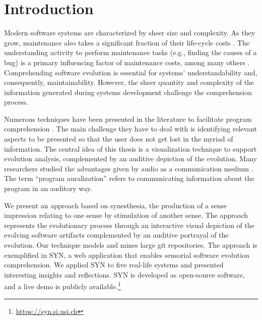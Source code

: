 \documentclass[11pt,twoside,english,singlespacing,headsepline,consistentlayout]{auxiliary/si-msc-thesis}
\author{Gianlorenzo Occhipinti}
\newcommand{\quotes}[1]{``#1''}
\begin{document}
\frontmatter
\pagestyle{plain}




\mainmatter
 
\pagestyle{thesis} 



\section*{Introduction}
Modern software systems are characterized by sheer size and complexity. As they grow, maintenance also takes a significant fraction of their life-cycle costs \cite{Davis1995, Sommerville1995, Erlikh2000, seacord2003}. The understanding activity to perform maintenance tasks (e.g., finding the causes of a bug) is a primary influencing factor of maintenance costs, among many others \cite{Corbi1989}.
Comprehending software evolution is essential for systems' understandability and, consequently, maintainability. However, the sheer quantity and complexity of the information generated during systems development challenge the comprehension process.

Numerous techniques have been presented in the literature to facilitate program comprehension \cite{Lanza2001, DAmbros2006, Steinbrueckner2010, Wettel2011, Alexandru2019, SoftwareEvolution}. The main challenge they have to deal with is identifying relevant aspects to be presented so that the user does not get lost in the myriad of information. 
The central idea of this thesis is a visualization technique to support evolution analysis, complemented by an auditive depiction of the evolution. 
Many researchers studied the advantages given by audio as a communication medium \cite{Alty1995, Vickers2004, Boccuzzo2009, McIntosh2014, Mancino2017}.
The term \quotes{program auralization} refers to communicating information about the program in an auditory way.

We present an approach based on synesthesia, the production of a sense impression relating to one sense by stimulation of another sense. The approach represents the evolutionary process through an interactive visual depiction of the evolving software artifacts complemented by an auditive portrayal of the evolution. Our technique models and mines large git repositories.
The approach is exemplified in SYN, a web application that enables sensorial software evolution comprehension.
We applied SYN to five real-life systems and presented interesting insights and reflections. SYN is developed as open-source software, and a live demo is publicly available.\footnote{\url{https://syn.si.usi.ch}}
\end{document}
